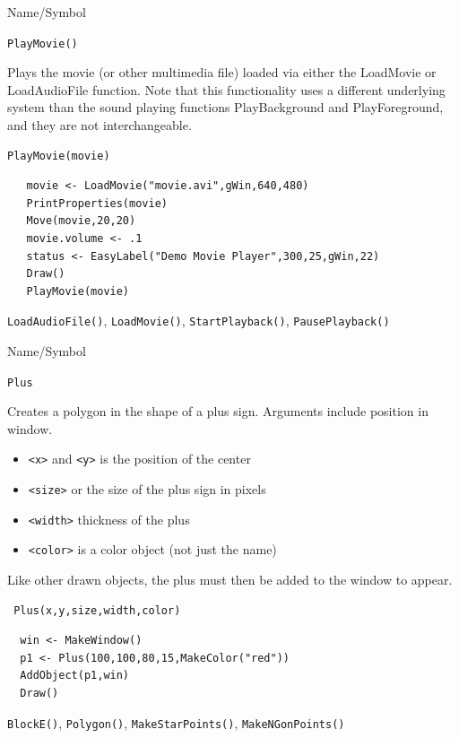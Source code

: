 \begin{desc}{Name/Symbol}
\item[Name/Symbol]	\verb+PlayMovie()+
 
\item[Description]	Plays the movie (or other multimedia file) loaded via
either the LoadMovie or LoadAudioFile function.  Note that this functionality uses a 
different underlying system than the sound playing functions PlayBackground and PlayForeground,
and they are not interchangeable.

\item[Usage]		
\begin{verbatim}
PlayMovie(movie)
\end{verbatim}

\item[Example]	
\begin{verbatim}
   movie <- LoadMovie("movie.avi",gWin,640,480)
   PrintProperties(movie)
   Move(movie,20,20)
   movie.volume <- .1
   status <- EasyLabel("Demo Movie Player",300,25,gWin,22)    
   Draw()
   PlayMovie(movie)
\end{verbatim}

\item[See Also] \verb+LoadAudioFile()+, \verb+LoadMovie()+, \verb+StartPlayback()+, \verb+PausePlayback()+
\end{desc}




\begin{desc}{Name/Symbol}
\item[Name/Symbol]  	\verb+Plus+ 

\item[Description] Creates a polygon in the shape of a
 plus sign. Arguments include position in window.
\begin{itemize}
\item \verb+<x>+ and \verb+<y>+ is the position of the center
\item \verb+<size>+ or the size of the plus sign in pixels
\item \verb+<width>+ thickness of the plus
\item \verb+<color>+ is a color object (not just the name)
\end{itemize}

Like other drawn objects, the plus must then be added to the window
to appear.

\item[Usage]		
\begin{verbatim}
 Plus(x,y,size,width,color)
\end{verbatim}

\item[Example]	
\begin{verbatim}
  win <- MakeWindow()
  p1 <- Plus(100,100,80,15,MakeColor("red"))
  AddObject(p1,win)
  Draw()
\end{verbatim}

\item[See Also]   
\verb+BlockE()+, \verb+Polygon()+, \verb+MakeStarPoints()+,
\verb+MakeNGonPoints()+
\end{desc}

